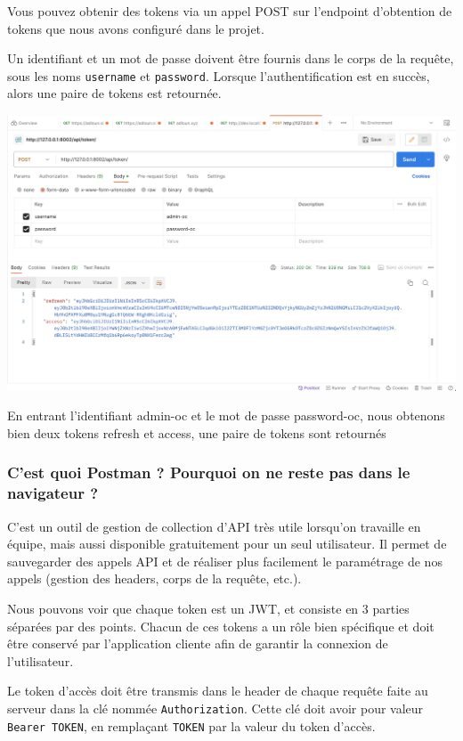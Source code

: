 \documentclass[a4paper]{article}
\begin{document}
Vous pouvez obtenir des tokens via un appel POST sur l'endpoint d’obtention de tokens que nous avons configuré dans le projet.

Un identifiant et un mot de passe doivent être fournis dans le corps de la requête, sous les noms {\tt username}  et {\tt password}. Lorsque l’authentification est en succès, alors une paire de tokens est retournée.
\begin{center}
\includegraphics[width=15cm]{images/image24.png}
\end{center}
En entrant l’identifiant admin-oc et le mot de passe password-oc, nous obtenons bien deux tokens refresh et access, une paire de tokens sont retournés

\subsubsection*{C’est quoi Postman ? Pourquoi on ne reste pas dans le navigateur ?}
C’est un outil de gestion de collection d’API très utile lorsqu’on travaille en équipe, mais aussi disponible gratuitement pour un seul utilisateur. Il permet de {\color{monOrange}sauvegarder des appels API} et de réaliser plus facilement le {\color{monOrange}paramétrage de nos appels} (gestion des headers, corps de la requête, etc.).

Nous pouvons voir que chaque token est un JWT, et consiste en 3 parties séparées par des points. Chacun de ces tokens a un {\color{monOrange}rôle bien spécifique} et doit être {\color{monOrange}conservé} par l’application cliente afin de garantir la connexion de l’utilisateur.

Le token d’accès doit être transmis dans le header de chaque requête faite au serveur dans la clé nommée {\tt Authorization}. Cette clé doit avoir pour valeur  {\tt Bearer TOKEN}, en remplaçant  {\tt TOKEN}   par la valeur du token d’accès.
\end{document}
